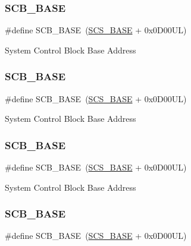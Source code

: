 \subsubsection{\texorpdfstring{SCB\_BASE}{SCB\_BASE}\hspace{0.1cm}{\footnotesize\ttfamily [9/12]}}
{\footnotesize\ttfamily \#define S\+C\+B\+\_\+\+B\+A\+SE~(\mbox{\hyperlink{group___c_m_s_i_s__core__base_ga3c14ed93192c8d9143322bbf77ebf770}{S\+C\+S\+\_\+\+B\+A\+SE}} +  0x0\+D00\+U\+L)}

System Control Block Base Address \mbox{\label{group___c_m_s_i_s__core__base_gad55a7ddb8d4b2398b0c1cfec76c0d9fd}} 
\subsubsection{\texorpdfstring{SCB\_BASE}{SCB\_BASE}\hspace{0.1cm}{\footnotesize\ttfamily [10/12]}}
{\footnotesize\ttfamily \#define S\+C\+B\+\_\+\+B\+A\+SE~(\mbox{\hyperlink{group___c_m_s_i_s__core__base_ga3c14ed93192c8d9143322bbf77ebf770}{S\+C\+S\+\_\+\+B\+A\+SE}} +  0x0\+D00\+U\+L)}

System Control Block Base Address \mbox{\label{group___c_m_s_i_s__core__base_gad55a7ddb8d4b2398b0c1cfec76c0d9fd}} 
\subsubsection{\texorpdfstring{SCB\_BASE}{SCB\_BASE}\hspace{0.1cm}{\footnotesize\ttfamily [11/12]}}
{\footnotesize\ttfamily \#define S\+C\+B\+\_\+\+B\+A\+SE~(\mbox{\hyperlink{group___c_m_s_i_s__core__base_ga3c14ed93192c8d9143322bbf77ebf770}{S\+C\+S\+\_\+\+B\+A\+SE}} +  0x0\+D00\+U\+L)}

System Control Block Base Address \mbox{\label{group___c_m_s_i_s__core__base_gad55a7ddb8d4b2398b0c1cfec76c0d9fd}} 
\subsubsection{\texorpdfstring{SCB\_BASE}{SCB\_BASE}\hspace{0.1cm}{\footnotesize\ttfamily [12/12]}}
{\footnotesize\ttfamily \#define S\+C\+B\+\_\+\+B\+A\+SE~(\mbox{\hyperlink{group___c_m_s_i_s__core__base_ga3c14ed93192c8d9143322bbf77ebf770}{S\+C\+S\+\_\+\+B\+A\+SE}} +  0x0\+D00\+U\+L)}

